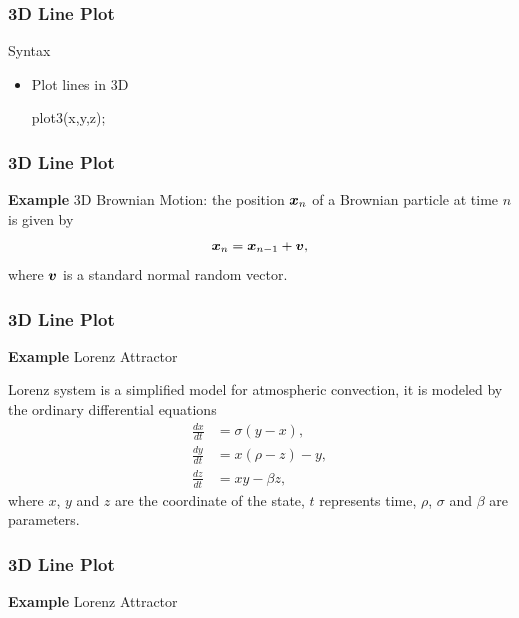 \documentclass{beamer}  %
\begin{document}
\begin{frame}[fragile]
\frametitle{3D Line Plot}
\begin{block}{Syntax}
\begin{itemize}
    \item Plot lines in 3D
          \begin{matlabcodebeamer}[numbers=none,frame=none]
          plot3(x,y,z);
          \end{matlabcodebeamer}
\end{itemize}
\end{block}

\end{frame}
\begin{frame}[fragile]
\frametitle{3D Line Plot}
\textbf{Example} 3D Brownian Motion:
the position $\boldsymbol{x}_n$ of a Brownian particle at time $n$ is given by
\begin{equation}
    \boldsymbol{x}_n = \boldsymbol{x}_{n-1} + \boldsymbol{v},
\end{equation}
where $\boldsymbol{v}$ is a standard normal random vector.

\setcounter{subfigure}{0}
\begin{figure}
    \centering
\end{figure}

\end{frame}
\begin{frame}[fragile]
\frametitle{3D Line Plot}
\textbf{Example} Lorenz Attractor

Lorenz system is a simplified model for atmospheric convection, it is modeled by the ordinary differential equations
 \begin{align}
\frac{dx}{dt} &= \sigma (y - x), \\
\frac{dy}{dt} &= x (\rho - z) - y, \\
\frac{dz}{dt} &= x y - \beta z,
\end{align} 
where $x$, $y$ and $z$ are the coordinate of the state, $t$ represents time, $\rho$, $\sigma$ and $\beta$ are parameters.


\end{frame}
\begin{frame}[fragile]
\frametitle{3D Line Plot}
\textbf{Example} Lorenz Attractor

\setcounter{subfigure}{0}
\begin{figure}
    \centering
\end{figure}

\end{frame}
\end{document}
